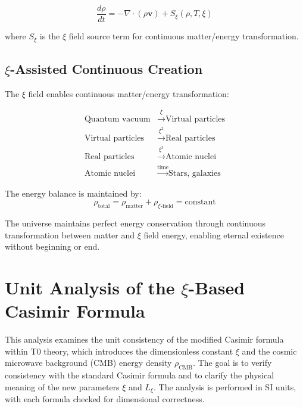 	\begin{equation}
		\frac{d\rho}{dt} = -\nabla \cdot (\rho \mathbf{v}) + S_\xi(\rho, T, \xi)
	\end{equation}
	
	where $S_\xi$ is the $\xi$ field source term for continuous matter/energy transformation.
	
	\subsection{$\xi$-Assisted Continuous Creation}
	
	The $\xi$ field enables continuous matter/energy transformation:
	
	\begin{align}
		\text{Quantum vacuum} &\xrightarrow{\xi} \text{Virtual particles} \\
		\text{Virtual particles} &\xrightarrow{\xi^2} \text{Real particles} \\
		\text{Real particles} &\xrightarrow{\xi^3} \text{Atomic nuclei} \\
		\text{Atomic nuclei} &\xrightarrow{\text{time}} \text{Stars, galaxies}
	\end{align}
	
	The energy balance is maintained by:
	\begin{equation}
		\rho_{\text{total}} = \rho_{\text{matter}} + \rho_{\xi\text{-field}} = \text{constant}
	\end{equation}
	
	\begin{important}
		The universe maintains perfect energy conservation through continuous transformation between matter and $\xi$ field energy, enabling eternal existence without beginning or end.
	\end{important}
	
	\section{Unit Analysis of the $\xi$-Based Casimir Formula}
	
	This analysis examines the unit consistency of the modified Casimir formula within T0 theory, which introduces the dimensionless constant $\xi$ and the cosmic microwave background (CMB) energy density $\rho_{\text{CMB}}$. The goal is to verify consistency with the standard Casimir formula and to clarify the physical meaning of the new parameters $\xi$ and $L_\xi$. The analysis is performed in SI units, with each formula checked for dimensional correctness.
	
